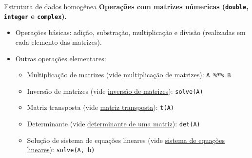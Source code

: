 \documentclass[
  10pt,
  ignorenonframetext,
]{beamer}
\providecommand{\tightlist}{%
  \setlength{\itemsep}{0pt}\setlength{\parskip}{0pt}}
\begin{document}
\begin{frame}[fragile]{Estrutura de dados homogênea}
\protect\hypertarget{estrutura-de-dados-homoguxeanea-11}{}
\textbf{Operações com matrizes númericas (\texttt{double},
\texttt{integer} e \texttt{complex}).}

\begin{itemize}
\tightlist
\item
  Operações básicas: adição, substração, multiplicação e divisão
  (realizadas em cada elemento das matrizes).
\item
  Outras operações elementares:

  \begin{itemize}
  \tightlist
  \item
    Multiplicação de matrizes (vide
    \href{https://pt.wikipedia.org/wiki/Produto_de_matrizes}{multiplicação
    de matrizes}): \texttt{A\ \%*\%\ B}
  \item
    Inversão de matrizes (vide
    \href{https://pt.wikipedia.org/wiki/Matriz_inversa}{inversão de
    matrizes}): \texttt{solve(A)}
  \item
    Matriz transposta (vide
    \href{https://pt.wikipedia.org/wiki/Matriz_transposta}{matriz
    transposta}): \texttt{t(A)}
  \item
    Determinante (vide
    \href{https://pt.wikipedia.org/wiki/Determinante}{determinante de
    uma matriz}): \texttt{det(A)}
  \item
    Solução de sistema de equações lineares (vide
    \href{https://pt.wikipedia.org/wiki/Sistema_de_equações_lineares}{sistema
    de equações lineares}): \texttt{solve(A,\ b)}
  \end{itemize}
\end{itemize}
\end{frame}
\end{document}

